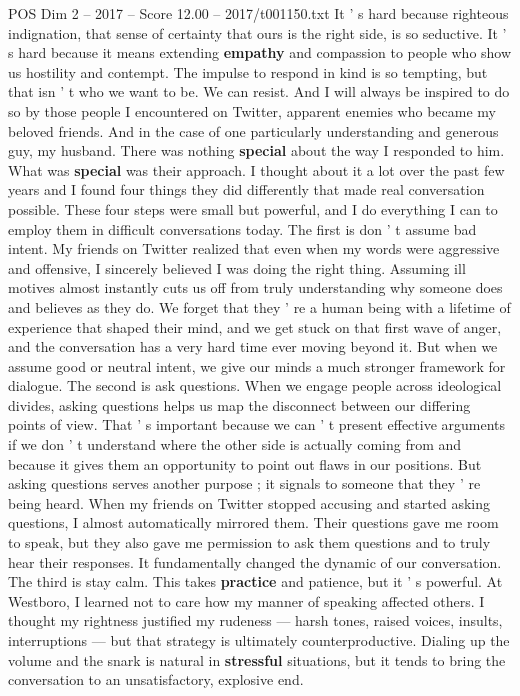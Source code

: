 \begin{textsample}{POS Dim 2 – 2017 – Score 12.00 – 2017/t001150.txt}
It ' s hard because righteous indignation, that sense of certainty that ours is the right side, is so seductive.
It ' s hard because it means extending \textbf{empathy} and compassion to people who show us hostility and contempt.
The impulse to respond in kind is so tempting, but that isn ' t who we want to be.
We can resist.
And I will always be inspired to do so by those people I encountered on Twitter, apparent enemies who became my beloved friends.
And in the case of one particularly understanding and generous guy, my husband.
There was nothing \textbf{special} about the way I responded to him.
What was \textbf{special} was their approach.
I thought about it a lot over the past few years and I found four things they did differently that made real conversation possible.
These four steps were small but powerful, and I do everything I can to employ them in difficult conversations today.
The first is don ' t assume bad intent.
My friends on Twitter realized that even when my words were aggressive and offensive, I sincerely believed I was doing the right thing.
Assuming ill motives almost instantly cuts us off from truly understanding why someone does and believes as they do.
We forget that they ' re a human being with a lifetime of experience that shaped their mind, and we get stuck on that first wave of anger, and the conversation has a very hard time ever moving beyond it.
But when we assume good or neutral intent, we give our minds a much stronger framework for dialogue.
The second is ask questions.
When we engage people across ideological divides, asking questions helps us map the disconnect between our differing points of view.
That ' s important because we can ' t present effective arguments if we don ' t understand where the other side is actually coming from and because it gives them an opportunity to point out flaws in our positions.
But asking questions serves another purpose ; it signals to someone that they ' re being heard.
When my friends on Twitter stopped accusing and started asking questions, I almost automatically mirrored them.
Their questions gave me room to speak, but they also gave me permission to ask them questions and to truly hear their responses.
It fundamentally changed the dynamic of our conversation.
The third is stay calm.
This takes \textbf{practice} and patience, but it ' s powerful.
At Westboro, I learned not to care how my manner of speaking affected others.
I thought my rightness justified my rudeness — harsh tones, raised voices, insults, interruptions — but that strategy is ultimately counterproductive.
Dialing up the volume and the snark is natural in \textbf{stressful} situations, but it tends to bring the conversation to an unsatisfactory, explosive end.

\end{textsample}
